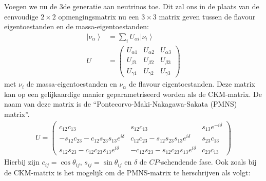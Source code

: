 \documentclass[../main.tex]{subfiles}
\begin{document}
Voegen we nu de 3de generatie aan neutrinos toe. Dit zal ons in de plaats van de eenvoudige $2\times 2$ opmengingsmatrix nu een $3\times 3$ matrix geven tussen de flavour eigentoestanden en de massa-eigentoestanden:
\begin{equation}
    \begin{aligned}
        \label{eq:neutrino_3_oscilaties_1}
\left|\nu_{\alpha}\right> &=\sum_{i} U_{\alpha i}\left|\nu_{i}\right> \\
        U &=\left(\begin{array}{lll}
                U_{\alpha 1} & U_{\alpha 2} & U_{\alpha 3} \\
                U_{\beta 1} & U_{\beta 2} & U_{\beta 3} \\
                U_{\gamma 1} & U_{\gamma 2} & U_{\gamma 3}
        \end{array}\right)
    \end{aligned}
\end{equation}
met $\nu_i$ de massa-eigentoestanden en $\nu_\alpha$ de flavour eigentoestanden.
Deze matrix kan op een gelijkaardige manier geparametriseerd worden als de CKM-matrix. De naam van deze matrix is de ``Pontecorvo-Maki-Nakagawa-Sakata (PMNS) matrix''.
\begin{equation}
    \begin{aligned}
        \label{eq:pmns_matrix}
        U=\left(\begin{array}{ccc}
                c_{12} c_{13} & s_{12} c_{13} & s_{13} e^{-i \delta} \\
                -s_{12} c_{23}-c_{12} s_{23} s_{13} e^{i \delta} & c_{12} c_{23}-s_{12} s_{23} s_{13} e^{i \delta} & s_{23} c_{13} \\
                s_{12} s_{23}-c_{12} c_{23} s_{13} e^{i \delta} & -c_{12} s_{23}-s_{12} c_{23} s_{13} e^{i \delta} & c_{23} c_{13}
        \end{array}\right)
    \end{aligned}
\end{equation}
Hierbij zijn $c_{i j}=\cos \theta_{i j}$, $s_{i j}=\sin \theta_{i j}$ en $\delta$ de $CP$-schendende fase. Ook zoals bij de CKM-matrix is het mogelijk om de PMNS-matrix te herschrijven als volgt:
\end{document}
